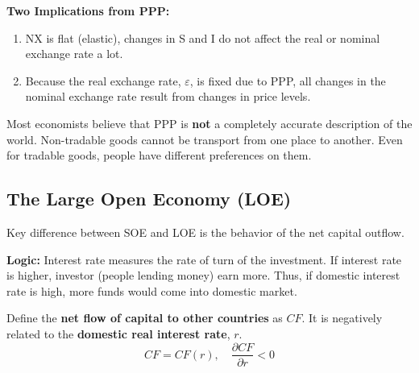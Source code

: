\documentclass[12pt]{article}
\begin{document}
{\textbf {Two Implications from PPP:}}\\
\begin{enumerate}
		\item NX is flat (elastic), changes in S and I do not affect the real or
				nominal exchange rate a lot.
		\item Because the real exchange rate, $ \varepsilon $, is fixed due to PPP, all
				changes in the nominal exchange rate result from changes in price levels.
\end{enumerate}

Most economists believe that PPP is {\textbf {not}} a completely accurate description
of the world. Non-tradable goods cannot be transport from one place to another. Even
for tradable goods, people have different preferences on them.








\subsection{The Large Open Economy (LOE)}

Key difference between SOE and LOE is the behavior of the net capital outflow.

{\textbf {Logic:}} Interest rate measures the rate of turn of the investment. If
interest rate is higher, investor (people lending money) earn more. Thus, if domestic
interest rate is high, more funds would come into domestic market. 

Define the {\textbf {net flow of capital to other countries}} as $ CF $. It is 
negatively related to the {\textbf {domestic real interest rate}}, $ r $.
\begin{equation*}
CF = CF(r), \quad \frac{\partial CF }{\partial r } < 0
\end{equation*}

\begin{figure}[H]
\end{figure}
\end{document}
